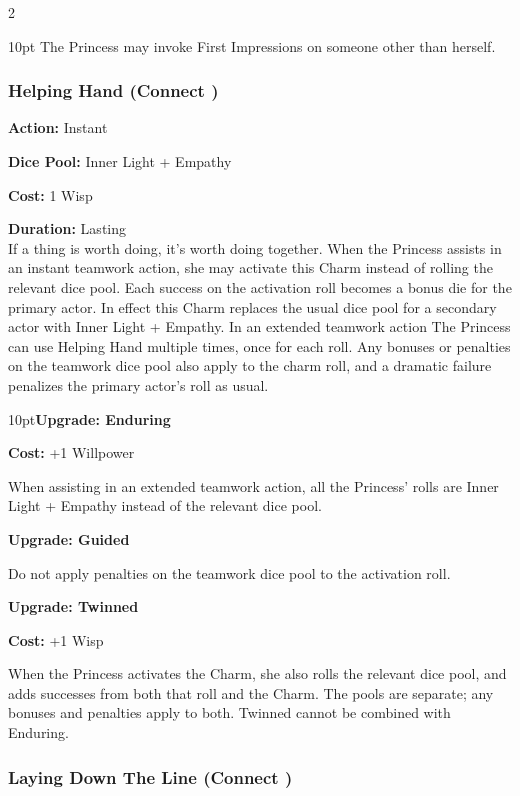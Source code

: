 \begin{multicols}{2}
\begin{myindentpar}{10pt}
    The Princess may invoke First Impressions on someone other than herself. 

\end{myindentpar}

\subsubsection*{Helping Hand (Connect \textbullet)}

\noindent \textbf{Action:} Instant

\noindent \textbf{Dice Pool:} Inner Light + Empathy

\noindent \textbf{Cost:} 1 Wisp

\noindent \textbf{Duration:} Lasting\\

\noindent  If a thing is worth doing, it's worth doing together. When the Princess assists in an instant teamwork action, she may activate this Charm instead of rolling the relevant dice pool. Each success on the activation roll becomes a bonus die for the primary actor. In effect this Charm replaces the usual dice pool for a secondary actor with Inner Light + Empathy. In an extended teamwork action The Princess can use Helping Hand multiple times, once for each roll. Any bonuses or penalties on the teamwork dice pool also apply to the charm roll, and a dramatic failure penalizes the primary actor's roll as usual.

\begin{myindentpar}{10pt}\textbf{Upgrade: Enduring}

\noindent \textbf{Cost:} +1 Willpower

When assisting in an extended teamwork action, all the Princess' rolls are Inner Light + Empathy instead of the relevant dice pool.

\textbf{Upgrade: Guided}

Do not apply penalties on the teamwork dice pool to the activation roll.

\textbf{Upgrade: Twinned}

\noindent \textbf{Cost:} +1 Wisp

When the Princess activates the Charm, she also rolls the relevant dice pool, and adds successes from both that roll and the Charm. The pools are separate; any bonuses and penalties apply to both. Twinned cannot be combined with Enduring. \end{myindentpar}


\subsubsection*{Laying Down The Line (Connect \textbullet)}


\end{multicols}
